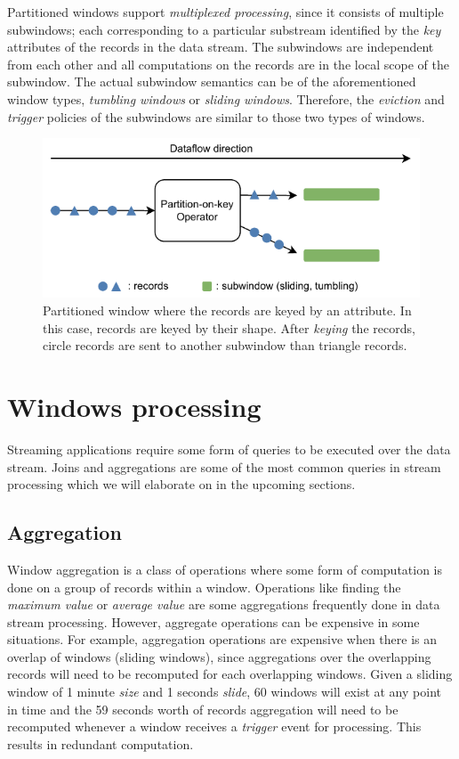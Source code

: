 Partitioned windows support \emph{multiplexed processing}, since it consists of  
multiple subwindows; each corresponding to a particular substream identified 
by the \emph{key} attributes of the records in the data stream. The subwindows 
are independent from each other and all computations on the records are in the local scope 
of the subwindow. The actual subwindow semantics can be of the aforementioned window types, \emph{tumbling windows} or \emph{sliding windows}. Therefore, the 
\emph{eviction} and \emph{trigger} policies of the subwindows 
are similar to those two types of windows. 


\begin{figure}[htpb]
    \centering
    \includegraphics[width=0.8\linewidth]{fig/partitioned_window.pdf}
    \caption[Partitioned window where the records are keyed by an attribute]
    {Partitioned window where the records are keyed by an attribute. In this case,
    records are keyed by their shape. After \emph{keying} the records, circle records are sent 
    to another subwindow than triangle records.}%
    \label{fig:partitioned_window}
\end{figure}
   

\section{Windows processing}
\label{sec:windows_processing}

Streaming applications require some form of queries to be executed over 
the data stream. Joins and aggregations are some of the most common queries 
in stream processing which we will elaborate on in the upcoming sections. 

\subsection{Aggregation}%
\label{sub:Aggregation}
Window aggregation is a class of operations where some form of computation 
is done on a group of records within a window. Operations like 
finding the \emph{maximum value} or \emph{average value} are some 
aggregations frequently done in data stream processing. However, 
aggregate operations can be expensive in some situations. 
For example, aggregation operations are expensive when there is 
an overlap of windows (sliding windows), since aggregations over the overlapping 
records will need to be recomputed for each overlapping windows. Given a sliding 
window of 1 minute \emph{size} and 1 seconds \emph{slide}, 60 windows will exist 
at any point in time and the 59 seconds worth of records aggregation will need 
to be recomputed whenever a window receives a \emph{trigger} event for processing. 
This results in redundant computation. 

